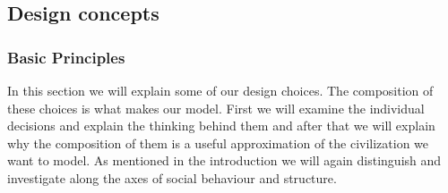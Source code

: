 \documentclass{JASSS}
\begin{document}
\subsection{Design concepts}

\subsubsection{Basic Principles}
	In this section we will explain some of our design choices. The composition of these choices is what makes our model. First we will examine the individual decisions and explain the thinking behind them and after that we will explain why the composition of them is a useful approximation of the civilization we want to model. As mentioned in the introduction we will again distinguish and investigate along the axes of social behaviour and structure.
	
\end{document}

